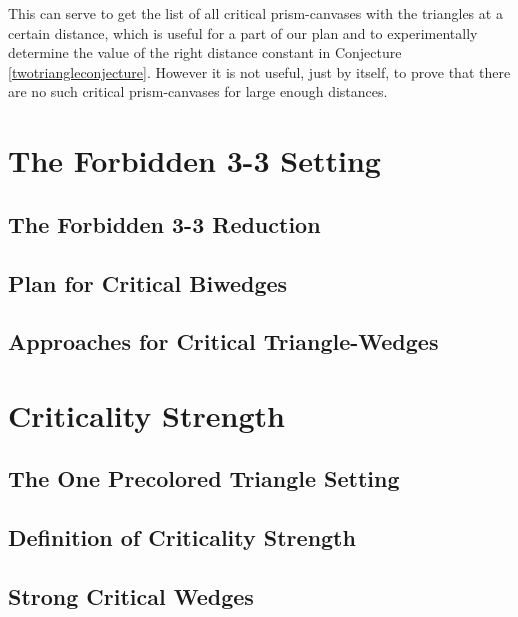 This can serve to get the list of
all critical prism-canvases with the triangles at a certain distance, which is useful
for a part of our plan and to experimentally determine the value of the right distance constant
in Conjecture \ref{twotriangleconjecture}.
However it is not useful, just by itself, to prove that there are no such critical prism-canvases
for large enough distances. 

\section{The Forbidden 3-3 Setting}

\subsection{The Forbidden 3-3 Reduction}

\subsection{Plan for Critical Biwedges}

\subsection{Approaches for Critical Triangle-Wedges} 

\section{Criticality Strength}

\subsection{The One Precolored Triangle Setting}

\subsection{Definition of Criticality Strength}

\subsection{Strong Critical Wedges}

